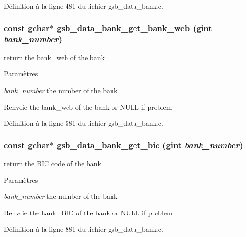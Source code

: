Définition à la ligne 481 du fichier gsb\_\-data\_\-bank.c.

\subsubsection[{gsb\_\-data\_\-bank\_\-get\_\-bank\_\-web}]{\setlength{\rightskip}{0pt plus 5cm}const gchar$\ast$ gsb\_\-data\_\-bank\_\-get\_\-bank\_\-web (gint {\em bank\_\-number})}\label{gsb__data__bank_8c_ae13bcbbbd9aa788c437c2487caf8a339}
return the bank\_\-web of the bank


\begin{DoxyParams}{Paramètres}
\item[{\em bank\_\-number}]the number of the bank\end{DoxyParams}
\begin{DoxyReturn}{Renvoie}
the bank\_\-web of the bank or NULL if problem 
\end{DoxyReturn}


Définition à la ligne 581 du fichier gsb\_\-data\_\-bank.c.

\subsubsection[{gsb\_\-data\_\-bank\_\-get\_\-bic}]{\setlength{\rightskip}{0pt plus 5cm}const gchar$\ast$ gsb\_\-data\_\-bank\_\-get\_\-bic (gint {\em bank\_\-number})}\label{gsb__data__bank_8c_a3a7de2749f841761e47909b5c6a7bc82}
return the BIC code of the bank


\begin{DoxyParams}{Paramètres}
\item[{\em bank\_\-number}]the number of the bank\end{DoxyParams}
\begin{DoxyReturn}{Renvoie}
the bank\_\-BIC of the bank or NULL if problem 
\end{DoxyReturn}


Définition à la ligne 881 du fichier gsb\_\-data\_\-bank.c.

